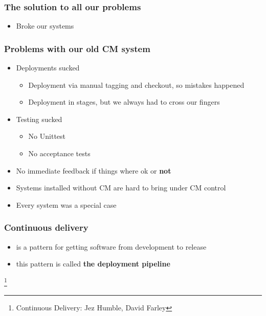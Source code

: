 \documentclass{beamer}
\begin{document}
\begin{frame}
  \frametitle{The solution to all our problems}
  \pause
  \begin{itemize}
  \item Broke our systems
  \end{itemize}
\end{frame}

\begin{frame}
\end{frame}

\begin{frame}
  \frametitle{Problems with our old CM system}

  \begin{itemize}
  \item <1-> Deployments sucked
    \begin{itemize}
    \item <2-> Deployment via manual tagging and checkout, so mistakes happened
    \item <2-> Deployment in stages, but we always had to cross our fingers
    \end{itemize}
  \item <3-> Testing sucked
    \pause
    \begin{itemize}
    \item <4-> No Unittest
    \item <4-> No acceptance tests
    \end{itemize}
  \item <5-> No immediate feedback if things where ok or \textbf{not}
  \item <6-> Systems installed without CM are hard to bring under CM control
  \item <7-> Every system was a special case
  \end{itemize}
\end{frame}

\begin{frame}
\end{frame}


\begin{frame}
  \frametitle{Continuous delivery}
  \begin{itemize}
  \item<1-> is a pattern for getting software from development to release
  \item<2-> this pattern is called \textbf{the deployment pipeline}
  \end{itemize}
  \footnote{Continuous Delivery: Jez Humble, David Farley}
\end{frame}
\end{document}
